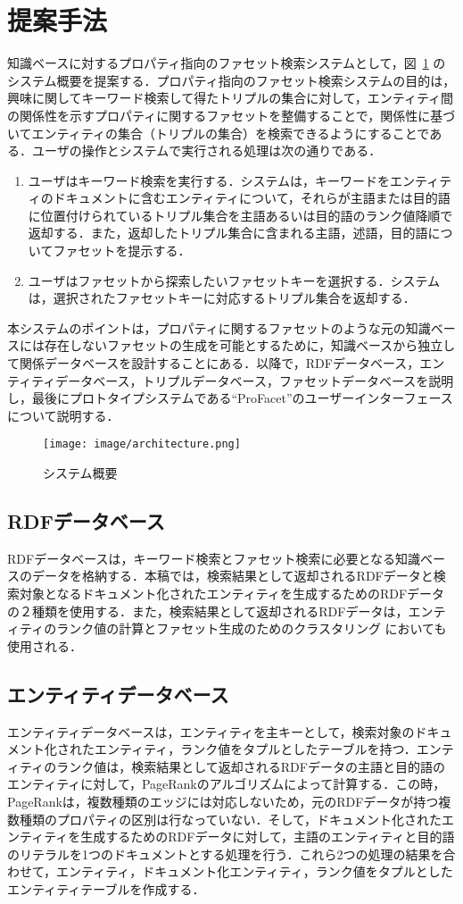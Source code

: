 \section{提案手法}
\label{sec:proposal}
知識ベースに対するプロパティ指向のファセット検索システムとして，図~\ref{fig:architecture} のシステム概要を提案する．プロパティ指向のファセット検索システムの目的は，興味に関してキーワード検索して得たトリプルの集合に対して，エンティティ間の関係性を示すプロパティに関するファセットを整備することで，関係性に基づいてエンティティの集合（トリプルの集合）を検索できるようにすることである．ユーザの操作とシステムで実行される処理は次の通りである．
\begin{enumerate}
	\item ユーザはキーワード検索を実行する．システムは，キーワードをエンティティのドキュメントに含むエンティティについて，それらが主語または目的語に位置付けられているトリプル集合を主語あるいは目的語のランク値降順で返却する．また，返却したトリプル集合に含まれる主語，述語，目的語についてファセットを提示する．
	\item ユーザはファセットから探索したいファセットキーを選択する．システムは，選択されたファセットキーに対応するトリプル集合を返却する．
\end{enumerate}

本システムのポイントは，プロパティに関するファセットのような元の知識ベースには存在しないファセットの生成を可能とするために，知識ベースから独立して関係データベースを設計することにある．以降で，RDFデータベース，エンティティデータベース，トリプルデータベース，ファセットデータベースを説明し，最後にプロトタイプシステムである``ProFacet''のユーザーインターフェースについて説明する．
%
\begin{figure}[h]
\centering
\texttt{[image: image/architecture.png]}
\caption{\small
システム概要
}
\label{fig:architecture}
\end{figure}
%
\subsection{RDFデータベース}
RDFデータベースは，キーワード検索とファセット検索に必要となる知識ベースのデータを格納する．本稿では，検索結果として返却されるRDFデータと検索対象となるドキュメント化されたエンティティを生成するためのRDFデータの２種類を使用する．また，検索結果として返却されるRDFデータは，エンティティのランク値の計算とファセット生成のためのクラスタリング においても使用される．
%
\subsection{エンティティデータベース}
エンティティデータベースは，エンティティを主キーとして，検索対象のドキュメント化されたエンティティ，ランク値をタプルとしたテーブルを持つ．エンティティのランク値は，検索結果として返却されるRDFデータの主語と目的語のエンティティに対して，PageRankのアルゴリズムによって計算する．この時，PageRankは，複数種類のエッジには対応しないため，元のRDFデータが持つ複数種類のプロパティの区別は行なっていない．そして，ドキュメント化されたエンティティを生成するためのRDFデータに対して，主語のエンティティと目的語のリテラルを1つのドキュメントとする処理を行う．これら2つの処理の結果を合わせて，エンティティ，ドキュメント化エンティティ，ランク値をタプルとしたエンティティテーブルを作成する．
%
